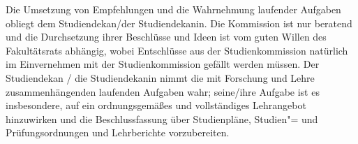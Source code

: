 Die Umsetzung von Empfehlungen und die Wahrnehmung laufender Aufgaben obliegt
dem Studiendekan/der Studiendekanin. Die Kommission ist nur beratend und die
Durchsetzung ihrer Beschlüsse und Ideen ist vom guten Willen des Fakultätsrats
abhängig, wobei Entschlüsse aus der Studienkommission natürlich im Einvernehmen
mit der Studienkommission gefällt werden müssen. Der Studiendekan / die
Studiendekanin nimmt die mit Forschung und Lehre zusammenhängenden laufenden
Aufgaben wahr; seine/ihre Aufgabe ist es insbesondere, auf ein ordnungsgemäßes
und vollständiges Lehrangebot hinzuwirken und die Beschlussfassung über
Studienpläne, Studien"= und Prüfungsordnungen und Lehrberichte vorzubereiten.
